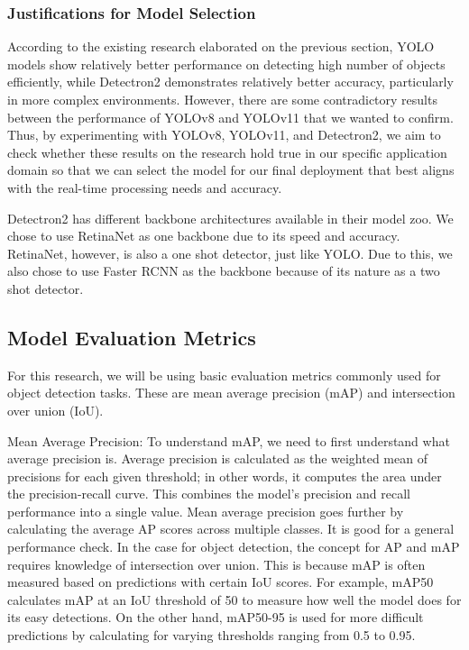 \documentclass[stu,12pt,floatsintext]{apa7}
\begin{document}
\subsubsection{Justifications for Model Selection}

According to the existing research elaborated on the previous section, YOLO models show relatively better performance on detecting high number of objects efficiently, while Detectron2 demonstrates relatively better accuracy, particularly in more complex environments. However, there are some contradictory results between the performance of YOLOv8 and YOLOv11 that we wanted to confirm. Thus, by experimenting with YOLOv8, YOLOv11, and Detectron2, we aim to check whether these results on the research hold true in our specific application domain so that we can select the model for our final deployment that best aligns with the real-time processing needs and accuracy. 

Detectron2 has different backbone architectures available in their model zoo. We chose to use RetinaNet as one backbone due to its speed and accuracy. RetinaNet, however, is also a one shot detector, just like YOLO. Due to this, we also chose to use Faster RCNN as the backbone because of its nature as a two shot detector.

\subsection{Model Evaluation Metrics}
For this research, we will be using basic evaluation metrics commonly used for object detection tasks. These are mean average precision (mAP) and intersection over union (IoU).

Mean Average Precision: To understand mAP, we need to first understand what average precision is. Average precision is calculated as the weighted mean of precisions for each given threshold; in other words, it computes the area under the precision-recall curve. This combines the model's precision and recall performance into a single value. Mean average precision goes further by calculating the average AP scores across multiple classes. It is good for a general performance check. In the case for object detection, the concept for AP and mAP requires knowledge of intersection over union. This is because mAP is often measured based on predictions with certain IoU scores. For example, mAP50 calculates mAP at an IoU threshold of 50 to measure how well the model does for its easy detections. On the other hand, mAP50-95 is used for more difficult predictions by calculating for varying thresholds ranging from 0.5 to 0.95.
\end{document}
